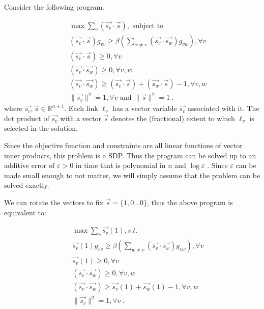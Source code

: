 \documentclass[11pt]{amsart}
\begin{document}
Consider the following program.

\begin{eqnarray*}
& & \max \sum_v (\vec{s_v} \cdot \vec{s}), \text{ subject to}\\
& & (\vec{s_v} \cdot \vec{s}) g_{vv} \geq \beta \left(\sum_{w \neq v} (\vec{s_v} \cdot \vec{s_w}) g_{vw}\right), \forall v\\
& & (\vec{s_v} \cdot \vec{s}) \geq 0, \forall v\\
& & (\vec{s_v} \cdot \vec{s_w}) \geq 0, \forall v,w \\
& & (\vec{s_v} \cdot \vec{s_w}) \geq (\vec{s_v} \cdot \vec{s}) + (\vec{s_w} \cdot \vec{s}) - 1, \forall v,w \\
& & \|\vec{s_v}\|^2 = 1, \forall v  \text{ and } \|\vec{s}\|^2 = 1 \ .
\end{eqnarray*}
where $\vec{s_v}, \vec{s} \in \mathbb{R}^{n+1}$. Each link $\ell_v$ has a vector variable $\vec{s_v}$ associated
with it. The dot product of $\vec{s_v}$ with a vector $\vec{s}$ denotes  the (fractional) extent to which $\ell_v$ is
selected in the solution. 

Since the objective function and constraints are all linear functions of vector inner products, this
problem is a SDP. Thus the program can be solved up to an additive error of $\varepsilon > 0$ in time that is polynomial in 
$n$ and $\log \varepsilon$ \cite{Vandenberghe94semidefiniteprogramming}. Since $\varepsilon$ can be made small enough to not matter, we will simply
assume that the problem can be solved exactly.

We can rotate the vectors to fix $\vec{s} = \{1, 0 \ldots 0\}$, thus the above program is equivalent to:

\begin{eqnarray}
& & \max \sum_v \vec{s_v}(1), s.t. \nonumber \\
& & \vec{s_v}(1) g_{vv} \geq \beta\left(\sum_{w \neq v} (\vec{s_v} \cdot \vec{s_w}) g_{vw}\right), \forall v \label{sdp:eqSINR}\\
& & \vec{s_v}(1) \geq 0, \forall v \label{sdp:o1}\\
& & (\vec{s_v} \cdot \vec{s_w}) \geq 0, \forall v,w \label{sdp:o2} \\
& & (\vec{s_v} \cdot \vec{s_w}) \geq \vec{s_v}(1) + \vec{s_w}(1) - 1, \forall v,w \label{sdp:eqSp}\\
& & \|\vec{s_v}\|^2 = 1, \forall v  \label{sdp:o3}\ .
\end{eqnarray}
\end{document}
